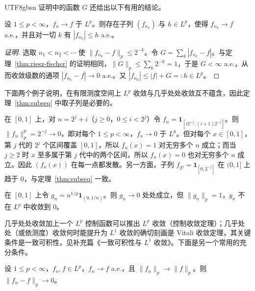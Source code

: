 \documentclass[11pt]{article}
\newcommand{\norm}[1]{\lVert #1\rVert}
\newcommand{\ind}{\mathbf{1}}
\begin{document}
\begin{CJK*}{UTF8}{gbsn}
证明中的函数 $G$ 还给出以下有用的结论。

\begin{theorem}[几乎处处收敛的子列]\label{thm:subseq}
设 $1\le p<\infty$，$f_{n}\to f$ 于 $L^{p}$。则存在子列 $(f_{n_{k}})$ 与 $h\in L^{p}$，使得 $f_{n_{k}}\to f$ a.e.，并且对一切 $k$ 有 $|f_{n_{k}}|\le h$ a.e.。
\end{theorem}

\begin{proof}[证明]
选取 $n_{1}<n_{2}<\cdots$ 使 $\norm{f_{n_{k}}-f}_{p}\le2^{-k}$。令 $G=\sum_{k}|f_{n_{k}}-f|$。与定理~\ref{thm:riesz-fischer} 的证明相同，$\norm{G}_{p}\le\sum_{k}2^{-k}=1$，于是 $G<\infty$ a.e.，从而收敛级数的通项 $|f_{n_{k}}-f|\to0$ a.e.。又 $|f_{n_{k}}|\le|f|+G=:h\in L^{p}$。
\end{proof}

下面两个例子说明，在有限测度空间上 $L^{p}$ 收敛与几乎处处收敛互不蕴含，因此定理~\ref{thm:subseq} 中取子列是必要的。

\begin{example}[打字机序列]\label{ex:typewriter}
在 $[0,1]$ 上，对 $n=2^{j}+i$（$j\ge0$，$0\le i<2^{j}$）令 $f_{n}=\ind_{[i2^{-j},(i+1)2^{-j}]}$。则 $\norm{f_{n}}_{p}^{p}=2^{-j}\to0$，即对每个 $1\le p<\infty$，$f_{n}\to0$ 于 $L^{p}$。但对每个 $x\in[0,1]$，第 $j$ 代的 $2^{j}$ 个区间覆盖 $[0,1]$，所以 $f_{n}(x)=1$ 对无穷多个 $n$ 成立；而当 $j\ge2$ 时 $x$ 至多属于第 $j$ 代中的两个区间，所以 $f_{n}(x)=0$ 也对无穷多个 $n$ 成立。因此 $(f_{n}(x))$ 在每一点都发散。另一方面，子列 $f_{2^{j}}=\ind_{[0,2^{-j}]}$ 在 $(0,1]$ 上趋于 $0$，与定理~\ref{thm:subseq} 一致。
\end{example}

\begin{example}\label{ex:ae-not-Lp}
在 $[0,1]$ 上令 $g_{n}=n^{1/p}\ind_{(0,1/n)}$。则 $g_{n}\to0$ 处处成立，但 $\norm{g_{n}}_{p}=1$，$g_{n}$ 不在 $L^{p}$ 中收敛到 $0$。
\end{example}

几乎处处收敛加上一个 $L^{p}$ 控制函数可以推出 $L^{p}$ 收敛（控制收敛定理）；几乎处处（或依测度）收敛何时能提升为 $L^{1}$ 收敛的确切刻画是 Vitali 收敛定理，其关键条件是一致可积性，见补充篇《一致可积性与 $L^{1}$ 收敛》。下面是另一个常用的充分条件。

\begin{proposition}\label{prop:riesz-scheffe}
设 $1\le p<\infty$，$f_{n},f\in L^{p}$，$f_{n}\to f$ a.e.，且 $\norm{f_{n}}_{p}\to\norm{f}_{p}$。则 $\norm{f_{n}-f}_{p}\to0$。
\end{proposition}


\end{CJK*}
\end{document}
